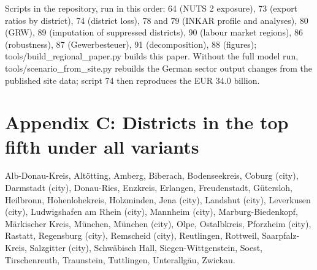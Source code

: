 \documentclass[
  11pt,
]{article}
\begin{document}
Scripts in the repository, run in this order: 64 (NUTS 2 exposure), 73
(export ratios by district), 74 (district loss), 78 and 79 (INKAR
profile and analyses), 80 (GRW), 89 (imputation of suppressed
districts), 90 (labour market regions), 86 (robustness), 87
(Gewerbesteuer), 91 (decomposition), 88 (figures);
tools/build\_regional\_paper.py builds this paper. Without the full
model run, tools/scenario\_from\_site.py rebuilds the German sector
output changes from the published site data; script 74 then reproduces
the EUR 34.0 billion.

\hypertarget{appendix-c-districts-in-the-top-fifth-under-all-variants}{%
\section{Appendix C: Districts in the top fifth under all
variants}\label{appendix-c-districts-in-the-top-fifth-under-all-variants}}

Alb-Donau-Kreis, Altötting, Amberg, Biberach, Bodenseekreis, Coburg
(city), Darmstadt (city), Donau-Ries, Enzkreis, Erlangen, Freudenstadt,
Gütersloh, Heilbronn, Hohenlohekreis, Holzminden, Jena (city), Landshut
(city), Leverkusen (city), Ludwigshafen am Rhein (city), Mannheim
(city), Marburg-Biedenkopf, Märkischer Kreis, München, München (city),
Olpe, Ostalbkreis, Pforzheim (city), Rastatt, Regensburg (city),
Remscheid (city), Reutlingen, Rottweil, Saarpfalz-Kreis, Salzgitter
(city), Schwäbisch Hall, Siegen-Wittgenstein, Soest, Tirschenreuth,
Traunstein, Tuttlingen, Unterallgäu, Zwickau.
\end{document}

